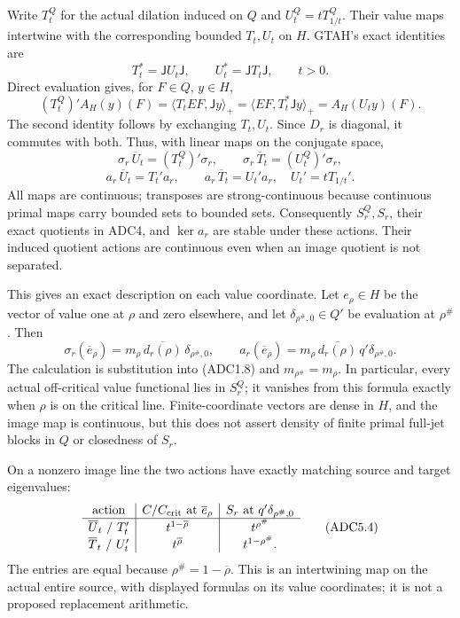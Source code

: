 Write \(T_t^Q\) for the actual dilation induced on \(Q\) and
\(U_t^Q=tT_{1/t}^Q\). Their value maps intertwine with the corresponding
bounded \(T_t,U_t\) on \(H\). GTAH's exact identities are \[
T_t^*=\mathsf JU_t\mathsf J,\qquad
U_t^*=\mathsf JT_t\mathsf J,\qquad t>0.
\tag{ADC5.1}
\] Direct evaluation gives, for \(F\in Q\), \(y\in H\), \[
(T_t^Q)'A_H(y)(F)
=\langle T_t EF,\mathsf Jy\rangle_+
=\langle EF,T_t^*\mathsf Jy\rangle_+
=A_H(U_ty)(F).
\] The second identity follows by exchanging \(T_t,U_t\). Since \(D_r\)
is diagonal, it commutes with both. Thus, with linear maps on the
conjugate space, \[
\sigma_r\,\overline U_t=(T_t^Q)'\sigma_r,\qquad
\sigma_r\,\overline T_t=(U_t^Q)'\sigma_r,
\] \[
a_r\,\overline U_t=T_t'a_r,\qquad
a_r\,\overline T_t=U_t'a_r,\quad U_t'=tT_{1/t}'.
\tag{ADC5.2}
\] All maps are continuous; transposes are strong-continuous because
continuous primal maps carry bounded sets to bounded sets. Consequently
\(S_r^Q,S_r\), their exact quotients in ADC4, and \(\ker a_r\) are
stable under these actions. Their induced quotient actions are
continuous even when an image quotient is not separated.

This gives an exact description on each value coordinate. Let
\(e_\rho\in H\) be the vector of value one at \(\rho\) and zero
elsewhere, and let \(\delta_{\rho^\#,0}\in Q'\) be evaluation at
\(\rho^\#\). Then \[
\sigma_r(\overline e_\rho)
=m_\rho\,\overline{d_r(\rho)}\,\delta_{\rho^\#,0},\qquad
a_r(\overline e_\rho)
=m_\rho\,\overline{d_r(\rho)}\,q'\delta_{\rho^\#,0}.
\tag{ADC5.3}
\] The calculation is substitution into (ADC1.8) and
\(m_{\rho^\#}=m_\rho\). In particular, every actual off-critical value
functional lies in \(S_r^Q\); it vanishes from this formula exactly when
\(\rho\) is on the critical line. Finite-coordinate vectors are dense in
\(H\), and the image map is continuous, but this does not assert density
of finite primal full-jet blocks in \(Q\) or closedness of \(S_r\).

On a nonzero image line the two actions have exactly matching source and
target eigenvalues: \[
\begin{array}{c|c|c}
\text{action}&C/C_{\rm crit}\text{ at }\overline e_\rho
&S_r\text{ at }q'\delta_{\rho^\#,0}\\ \hline
\overline U_t\text{ / }T_t'&t^{1-\overline\rho}&t^{\rho^\#}\\
\overline T_t\text{ / }U_t'&t^{\overline\rho}&t^{1-\rho^\#}.
\end{array}
\tag{ADC5.4}
\] The entries are equal because \(\rho^\#=1-\overline\rho\). This is an
intertwining map on the actual entire source, with displayed formulas on
its value coordinates; it is not a proposed replacement arithmetic.

